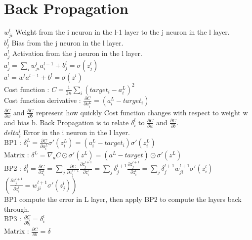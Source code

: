 \documentclass[12pt,a4paper]{article}
\begin{document}
\setcounter{secnumdepth}{0}
\section{Back Propagation}

$w_{ji}^l$ Weight from the i neuron in the l-1 layer to the j neuron in the l layer. \\
$b_j^l$ Bias from the j neuron in the l layer. \\

$a_j^l$ Activation from the j neuron in the l layer. \\
$a_j^l = \sum_{i} w_{ji}^l a_i^{l-1} + b_j^l = \sigma(z_j^l)$ \\
$a^l = w^l a^{l-1} + b^l = \sigma(z^l)$ \\


Cost function : $C = \frac{1}{2n} \sum_{i} (target_i - a_i^L)^2$ \\
Cost function derivative : $\frac{\partial C}{\partial a_i^L} = (a_i^L - target_i)$ \\


$\frac{\partial C}{\partial w}$ and $\frac{\partial C}{\partial b}$ represent how quickly Cost function changes with respect to weight w and bias b. Back Propagation is to relate $\delta^l_i$ to $\frac{\partial C}{\partial w}$ and $\frac{\partial C}{\partial b}$. \\

$delta^l_i$ Error in the i neuron in the l layer. \\

BP1 : $\delta _i^L = \frac{\partial C}{\partial a_i^L} \sigma'(z_i^L) = (a_i^L - target_i) \sigma'(z_i^L)$ \\
Matrix : $\delta ^L = \nabla _a C \odot \sigma'(z^L) = (a^L - target) \odot \sigma'(z^L)$ \\

BP2 : $\delta _i^l = \frac{\partial C}{\partial z_i^l} = \sum_{j} \frac{\partial C}{\partial z_j^{l+1}} \frac{\partial z_j^{l+1}}{\partial z_i^l} = \sum_{j} \delta _j^{l+1} \frac{\partial z_j^{l+1}}{\partial z_i^l} = \sum_{j} \delta _j^{l+1} w_{ji}^{l+1} \sigma '(z_i^l)$ \\
$( \frac{\partial z_j^{l+1}}{\partial z_i^l} = w_{ji}^{l+1} \sigma '(z_j^l) )$ \\

BP1 compute the error in L layer, then apply BP2 to compute the layers back through. \\


BP3 : $\frac{\partial C}{\partial b_i^l} = \delta _i^l$ \\
Matrix : $\frac{\partial C}{\partial b} = \delta$ \\
\end{document}

